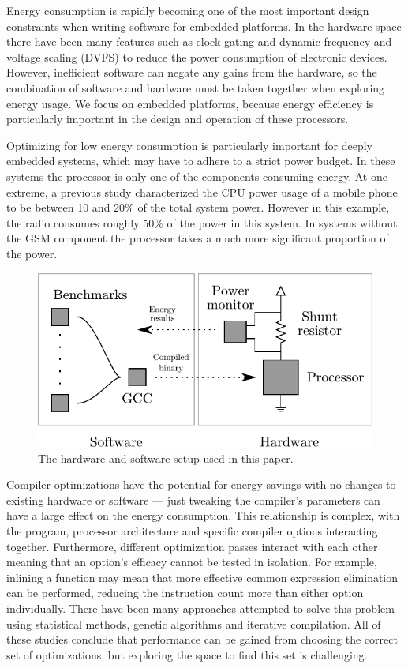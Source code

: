 \documentclass[twocolumn]{article}
\let\oldcaption\caption
\renewcommand{\caption}[1]{\oldcaption{\textup{#1}}}
\begin{document}
Energy consumption is rapidly becoming one of the most important design constraints when writing software for embedded platforms. In the hardware space there have been many features such as clock gating and dynamic frequency and voltage scaling (DVFS) to reduce the power consumption of electronic devices. However, inefficient software can negate any gains from the hardware, so the combination of software and hardware must be taken together when exploring energy usage. We focus on embedded platforms, because energy efficiency is particularly important in the design and operation of these processors.

Optimizing for low energy consumption is particularly important for deeply embedded systems, which may have to adhere to a strict power budget. In these systems the processor is only one of the components consuming energy. At one extreme, a previous study characterized the CPU power usage of a mobile phone to be between 10 and 20\% of the total system power\cite{SmartPhonePower}. However in this example, the radio consumes roughly 50\% of the power in this system. In systems without the GSM component the processor takes a much more significant proportion of the power.

\begin{figure}[b!]
	\includegraphics[width=\linewidth]{diagram.pdf}
	\caption{The hardware and software setup used in this paper.}
	\label{Fig:setup}
\end{figure}

Compiler optimizations have the potential for energy savings with no changes to existing hardware or software --- just tweaking the compiler's parameters can have a large effect on the energy consumption. This relationship is complex, with the program, processor architecture and specific compiler options interacting together. Furthermore, different optimization passes interact with each other meaning that an option's efficacy cannot be tested in isolation. For example, inlining a function may mean that more effective common expression elimination can be performed, reducing the instruction count more than either option individually. There have been many approaches attempted to solve this problem using statistical methods\cite{Haneda2005}, genetic algorithms\cite{Lin2008} and iterative compilation\cite{Kisuki1999}. All of these studies conclude that performance can be gained from choosing the correct set of optimizations, but exploring the space to find this set is challenging.
\end{document}
